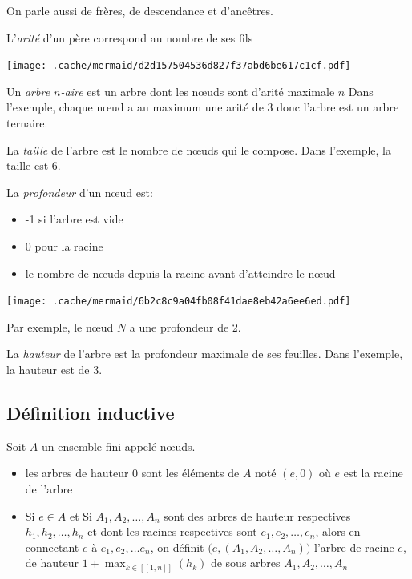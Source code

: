 On parle aussi de frères, de descendance et d'ancêtres.

L'\emph{arité} d'un père correspond au nombre de ses fils

\texttt{[image: .cache/mermaid/d2d157504536d827f37abd6be617c1cf.pdf]}

Un \emph{arbre \(n\)-aire} est un arbre dont les nœuds sont d'arité
maximale \(n\) Dans l'exemple, chaque nœud a au maximum une arité de 3
donc l'arbre est un arbre ternaire.

La \emph{taille} de l'arbre est le nombre de nœuds qui le compose. Dans
l'exemple, la taille est 6.

La \emph{profondeur} d'un nœud est:

\begin{itemize}
\tightlist
\item
  -1 si l'arbre est vide
\item
  0 pour la racine
\item
  le nombre de nœuds depuis la racine avant d'atteindre le nœud
\end{itemize}

\texttt{[image: .cache/mermaid/6b2c8c9a04fb08f41dae8eb42a6ee6ed.pdf]}

Par exemple, le nœud \(N\) a une profondeur de 2.

La \emph{hauteur} de l'arbre est la profondeur maximale de ses feuilles.
Dans l'exemple, la hauteur est de 3.

\hypertarget{duxe9finition-inductive}{%
\subsection{Définition inductive}\label{duxe9finition-inductive}}

Soit \(A\) un ensemble fini appelé nœuds.

\begin{itemize}
\tightlist
\item
  les arbres de hauteur 0 sont les éléments de \(A\) noté \((e,0)\) où
  \(e\) est la racine de l'arbre
\item
  Si \(e \in A\) et Si \(A_1, A_2, \ldots, A_n\) sont des arbres de
  hauteur respectives \(h_1, h_2, \ldots, h_n\) et dont les racines
  respectives sont \(e_1, e_2, \ldots, e_n\), alors en connectant \(e\)
  à \(e_1, e_2, \ldots e_n\), on définit
  \(\big(e, (A_1, A_2, \ldots, A_n)\big)\) l'arbre de racine \(e\), de
  hauteur \(\displaystyle 1 + \max_{k \in [\![ 1,n ]\!]} (h_k)\) de sous
  arbres \(A_1, A_2, \ldots, A_n\)
\end{itemize}

